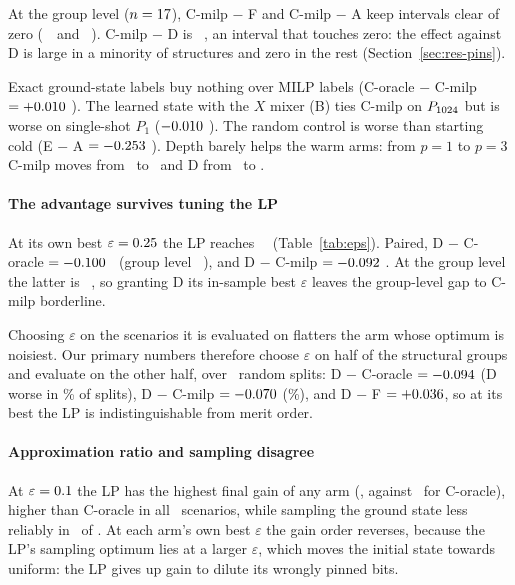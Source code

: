 At the group level ($n=17$), C-milp $-$ F and C-milp $-$ A keep intervals clear of zero (\CmilpMinusFGL\ \CmilpMinusFGLCI\ and \CmilpMinusAGL\ \CmilpMinusAGLCI). C-milp $-$ D is \CmilpMinusDGL\ \CmilpMinusDGLCI, an interval that touches zero: the effect against D is large in a minority of structures and zero in the rest (Section~\ref{sec:res-pins}).

Exact ground-state labels buy nothing over MILP labels (C-oracle $-$ C-milp $=+0.010$ \CoracleMinusCmilpCI). The learned state with the $X$ mixer (B) ties C-milp on $P_{1024}$ but is worse on single-shot $P_1$ ($-0.010$ \PoneBMinusCmilpCI). The random control is worse than starting cold (E $-$ A $=-0.253$ \EMinusACI). Depth barely helps the warm arms: from $p=1$ to $p=3$ C-milp moves from \PgndCmilp\ to \PgndPthreeCmilp\ and D from \PgndD\ to \PgndPthreeD.

\label{sec:res-tuned}
\paragraph{The advantage survives tuning the LP} At its own best $\varepsilon=0.25$ the LP reaches \PgndBestD\ \PgndBestCID\ (Table~\ref{tab:eps}). Paired, D $-$ C-oracle $=-0.100$ \BestDMinusCoracleCI\ (group level \BestDMinusCoracleGL\ \BestDMinusCoracleGLCI), and D $-$ C-milp $=-0.092$ \BestDMinusCmilpCI. At the group level the latter is \BestDMinusCmilpGL\ \BestDMinusCmilpGLCI, so granting D its in-sample best $\varepsilon$ leaves the group-level gap to C-milp borderline.

Choosing $\varepsilon$ on the scenarios it is evaluated on flatters the arm whose optimum is noisiest. Our primary numbers therefore choose $\varepsilon$ on half of the structural groups and evaluate on the other half, over \NSplits\ random splits: D $-$ C-oracle $=-0.094$ (D worse in \CVDMinusCoracleWorse\% of splits), D $-$ C-milp $=-0.070$ (\CVDMinusCmilpWorse\%), and D $-$ F $=+0.036$, so at its best the LP is indistinguishable from merit order.

\paragraph{Approximation ratio and sampling disagree} At $\varepsilon=0.1$ the LP has the highest final gain of any arm (\GfinalD, against \GfinalCoracle\ for C-oracle), higher than C-oracle in all \GfinalCoracleMinusDL\ scenarios, while sampling the ground state less reliably in \CoracleMinusDW\ of \CoracleMinusDN. At each arm's own best $\varepsilon$ the gain order reverses, because the LP's sampling optimum lies at a larger $\varepsilon$, which moves the initial state towards uniform: the LP gives up gain to dilute its wrongly pinned bits.

